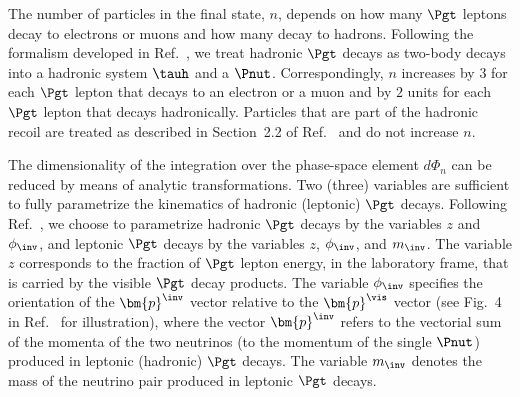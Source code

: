 The number of particles in the final state, $n$, depends on how many $\Pgt$ leptons decay to electrons or muons 
and how many decay to hadrons.
Following the formalism developed in Ref.~\cite{SVfitMEM}, 
we treat hadronic $\Pgt$ decays as two-body decays into a hadronic system $\tauh$ and a $\Pnut$.
Correspondingly, $n$ increases by $3$ for each $\Pgt$ lepton that decays to an electron or a muon
and by $2$ units for each $\Pgt$ lepton that decays hadronically.
Particles that are part of the hadronic recoil are treated as described in Section~2.2 of Ref.~\cite{SVfitMEM} 
and do not increase $n$.

The dimensionality of the integration over the phase-space element $d\Phi_{n}$ 
can be reduced by means of analytic transformations. 
Two (three) variables are sufficient to fully parametrize the kinematics of hadronic (leptonic) $\Pgt$ decays.
Following Ref.~\cite{SVfitMEM}, we choose to parametrize hadronic $\Pgt$ decays by the variables $z$ and $\phi_{\inv}$,
and leptonic $\Pgt$ decays by the variables $z$, $\phi_{\inv}$, and $m_{\inv}$.
The variable $z$ corresponds to the fraction of $\Pgt$ lepton energy, in the laboratory frame, that is carried by the visible $\Pgt$ decay products.
The variable $\phi_{\inv}$ specifies the orientation of the $\bm{p}^{\inv}$ vector relative to the $\bm{p}^{\vis}$ vector (see Fig.~4 in Ref.~\cite{SVfitMEM} for illustration),
where the vector $\bm{p}^{\inv}$ refers to the vectorial sum of the momenta of the two neutrinos (to the momentum of the single $\Pnut$) produced in leptonic (hadronic) $\Pgt$ decays.
The variable $m_{\inv}$ denotes the mass of the neutrino pair produced in leptonic $\Pgt$ decays.

